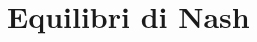 \documentclass[11pt,a4paper,oneside,openright]{book}
\begin{document}
    
    \tableofcontents
    
    \part{Equilibri di Nash}
    

	
\end{document}
